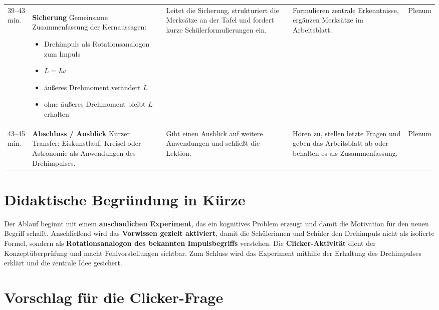 \documentclass[12pt,a4paper]{article}
\begin{document}
\begin{longtable}{@{}p{1.8cm}p{5.9cm}p{4.2cm}p{2.6cm}p{2.5cm}@{}}
\rowcolor{lightrow}
39--43 min.
&
\textbf{Sicherung} \newline
Gemeinsame Zusammenfassung der Kernaussagen:
\begin{itemize}[nosep,leftmargin=0.5cm]
    \item Drehimpuls als Rotationsanalogon zum Impuls
    \item \(L = I\omega\)
    \item äußeres Drehmoment verändert \(L\)
    \item ohne äußeres Drehmoment bleibt \(L\) erhalten
\end{itemize}
&
Leitet die Sicherung, strukturiert die Merksätze an der Tafel und fordert kurze Schülerformulierungen ein.
&
Formulieren zentrale Erkenntnisse, ergänzen Merksätze im Arbeitsblatt.
&
Plenum
\\

43--45 min.
&
\textbf{Abschluss / Ausblick} \newline
Kurzer Transfer: Eiskunstlauf, Kreisel oder Astronomie als Anwendungen des Drehimpulses.
&
Gibt einen Ausblick auf weitere Anwendungen und schließt die Lektion.
&
Hören zu, stellen letzte Fragen und geben das Arbeitsblatt ab oder behalten es als Zusammenfassung.
&
Plenum
\\

\end{longtable}

\vspace{0.3cm}

\section*{Didaktische Begründung in Kürze}

Der Ablauf beginnt mit einem \textbf{anschaulichen Experiment}, das ein kognitives Problem erzeugt und damit die Motivation für den neuen Begriff schafft. Anschließend wird das \textbf{Vorwissen gezielt aktiviert}, damit die Schülerinnen und Schüler den Drehimpuls nicht als isolierte Formel, sondern als \textbf{Rotationsanalogon des bekannten Impulsbegriffs} verstehen. Die \textbf{Clicker-Aktivität} dient der Konzeptüberprüfung und macht Fehlvorstellungen sichtbar. Zum Schluss wird das Experiment mithilfe der Erhaltung des Drehimpulses erklärt und die zentrale Idee gesichert.

\section*{Vorschlag für die Clicker-Frage}
\end{document}
